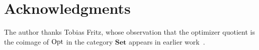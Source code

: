 \section*{Acknowledgments}

The author thanks Tobias Fritz, whose observation that the optimizer quotient is the coimage of $\operatorname{Opt}$ in the category $\mathbf{Set}$ appears in earlier work~\cite{simas2026optimizerquotient}.
